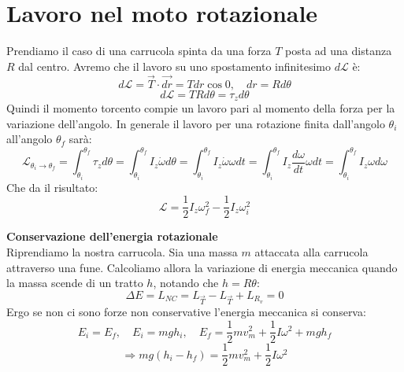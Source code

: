 \documentclass[a4paper,12pt]{article}
\begin{document}
\section{Lavoro nel moto rotazionale}
Prendiamo il caso di una carrucola spinta da una forza $T$ posta ad una distanza $R$ dal centro. Avremo che il lavoro su uno spostamento
infinitesimo $d\mathcal{L}$ è:
$$ d\mathcal{L} = \vec{T} \cdot \vec{dr} = T dr \cos{0}, \quad dr = Rd\theta $$
$$ d\mathcal{L} = TRd\theta = \tau_z d\theta $$
Quindi il momento torcento compie un lavoro pari al momento della forza per la variazione dell'angolo. In generale
il lavoro per una rotazione finita dall'angolo $\theta_i$ all'angolo $\theta_f$ sarà:
$$ \mathcal{L}_{\theta_i\rightarrow\theta_f} = \int_{\theta_i}^{\theta_f} \tau_z d\theta = \int_{\theta_i}^{\theta_f} I_z \dot{\omega} d\theta = \int_{\theta_i}^{\theta_f} I_z\dot{\omega}\omega dt = \int_{\theta_i}^{\theta_f} I_z \frac{d\omega}{dt}\omega dt = \int_{\theta_i}^{\theta_f} I_z \omega d\omega$$
Che da il risultato:
$$ \mathcal{L} = \frac{1}{2}I_z\omega_f^2 - \frac{1}{2}I_z\omega_i^2 $$
\par\smallskip
\textbf{Conservazione dell'energia rotazionale} \\
Riprendiamo la nostra carrucola. Sia una massa $m$ attaccata alla carrucola attraverso una fune. Calcoliamo allora la variazione di energia
meccanica quando la massa scende di un tratto $h$, notando che $h = R\theta$:
$$ \Delta E = L_{NC} = L_{\vec{T}} - L_{\vec{T}} + L_{R_v} = 0 $$
Ergo se non ci sono forze non conservative l'energia meccanica si conserva:
$$ E_i = E_f,\quad E_i = mgh_i, \quad E_f = \frac{1}{2}mv_m^2 + \frac{1}{2}I\omega^2 + mgh_f $$
$$ \Rightarrow mg(h_i-h_f) = \frac{1}{2}mv_m^2 + \frac{1}{2}I\omega^2 $$
\end{document}
